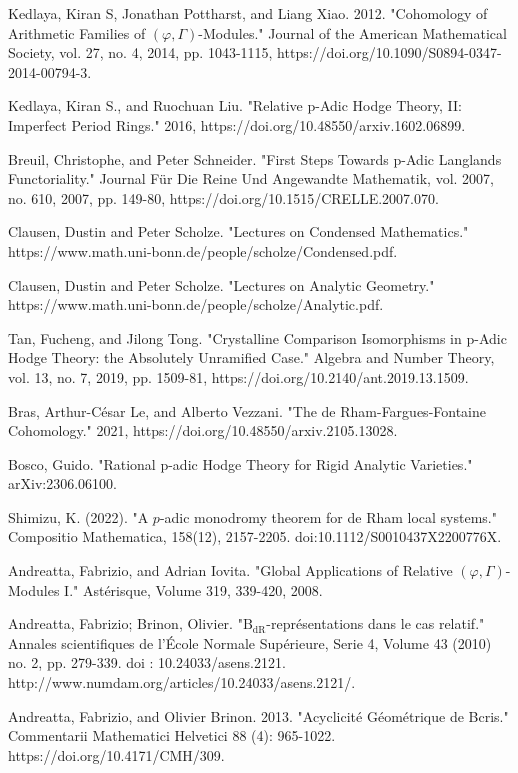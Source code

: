 \documentclass[12pt]{book}
\theoremstyle{definition}
\begin{document}
\begin{thebibliography}{}
 Kedlaya, Kiran S, Jonathan Pottharst, and Liang Xiao. 2012. "Cohomology of Arithmetic Families of $(\varphi,\Gamma)$-Modules." Journal of the American Mathematical Society, vol. 27, no. 4, 2014, pp. 1043-1115, https://doi.org/10.1090/S0894-0347-2014-00794-3.
 
 Kedlaya, Kiran S., and Ruochuan Liu. "Relative p-Adic Hodge Theory, II: Imperfect Period Rings." 2016, https://doi.org/10.48550/arxiv.1602.06899.

 Breuil, Christophe, and Peter Schneider. "First Steps Towards p-Adic Langlands Functoriality." Journal F\"ur Die Reine Und Angewandte Mathematik, vol. 2007, no. 610, 2007, pp. 149-80, https://doi.org/10.1515/CRELLE.2007.070.

 Clausen, Dustin and Peter Scholze. "Lectures on Condensed Mathematics." https://www.math.uni-bonn.de/people/scholze/Condensed.pdf.

 Clausen, Dustin and Peter Scholze. "Lectures on Analytic Geometry." https://www.math.uni-bonn.de/people/scholze/Analytic.pdf.

 Tan, Fucheng, and Jilong Tong. "Crystalline Comparison Isomorphisms in p-Adic Hodge Theory: the Absolutely Unramified Case." Algebra and Number Theory, vol. 13, no. 7, 2019, pp. 1509-81, https://doi.org/10.2140/ant.2019.13.1509.

 Bras, Arthur-C\'esar Le, and Alberto Vezzani. "The de Rham-Fargues-Fontaine Cohomology." 2021, https://doi.org/10.48550/arxiv.2105.13028.

 Bosco, Guido. "Rational p-adic Hodge Theory for Rigid Analytic Varieties." arXiv:2306.06100. 

 Shimizu, K. (2022). "A $p$-adic monodromy theorem for de Rham local systems." Compositio Mathematica, 158(12), 2157-2205. doi:10.1112/S0010437X2200776X.

 Andreatta, Fabrizio, and Adrian Iovita. "Global Applications of Relative $(\varphi,\Gamma)$-Modules I." Ast\'erisque, Volume 319, 339-420, 2008.

 Andreatta, Fabrizio; Brinon, Olivier. "$\mathrm {B}_{\mathrm {dR}}$-repr\'esentations dans le cas relatif." Annales scientifiques de l'\'Ecole Normale Sup\'erieure, Serie 4, Volume 43 (2010) no. 2, pp. 279-339. doi : 10.24033/asens.2121. http://www.numdam.org/articles/10.24033/asens.2121/.

 Andreatta, Fabrizio, and Olivier Brinon. 2013. "Acyclicit\'e G\'eom\'etrique de Bcris." Commentarii Mathematici Helvetici 88 (4): 965-1022. https://doi.org/10.4171/CMH/309.


\end{thebibliography}
\end{document}
